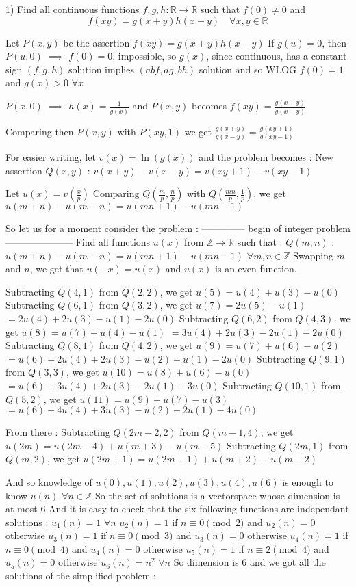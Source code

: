 \begin{solution}
	\begin{tcolorbox}1) Find all continuous functions $f,g,h:\mathbb{R}\to\mathbb{R}$ such that $f(0)\neq 0$ and 
\[f(xy)=g(x+y)h(x-y) \quad \forall x,y\in\mathbb{R}\]\end{tcolorbox}
Let $P(x,y)$ be the assertion $f(xy)=g(x+y)h(x-y)$
If $g(u)=0$, then $P(u,0)$ $\implies$ $f(0)=0$, impossible, so $g(x)$, since continuous, has a constant sign
$(f,g,h)$ solution implies $(abf,ag,bh)$ solution and so WLOG $f(0)=1$ and $g(x)>0$ $\forall x$

$P(x,0)$ $\implies$ $h(x)=\frac 1{g(x)}$ and $P(x,y)$ becomes $f(xy)=\frac{g(x+y)}{g(x-y)}$

Comparing then $P(x,y)$ with $P(xy,1)$ we get $\frac{g(x+y)}{g(x-y)}=\frac{g(xy+1)}{g(xy-1)}$

For easier writing, let $v(x)=\ln(g(x))$ and the problem becomes :
New assertion $Q(x,y)$ : $v(x+y)-v(x-y)=v(xy+1)-v(xy-1)$

Let $u(x)=v(\frac xp)$
Comparing $Q(\frac mp,\frac np)$ with $Q(\frac{mn}p,\frac 1p)$, we get $u(m+n)-u(m-n)=u(mn+1)-u(mn-1)$

So let us for a moment consider the problem :
-------------- begin of integer problem ---------------------
Find all functions $u(x)$ from $\mathbb Z\to \mathbb R$ such that :
$Q(m,n)$ : $u(m+n)-u(m-n)=u(mn+1)-u(mn-1)$ $\forall m,n\in\mathbb Z$
Swapping $m$ and $n$, we get that $u(-x)=u(x)$ and $u(x)$ is an even function.

Subtracting $Q(4,1)$ from $Q(2,2)$, we get $u(5)=u(4)+u(3)-u(0)$
Subtracting $Q(6,1)$ from $Q(3,2)$, we get $u(7)=2u(5)-u(1)$ $=2u(4)+2u(3)-u(1)-2u(0)$
Subtracting $Q(6,2)$ from $Q(4,3)$, we get $u(8)=u(7)+u(4)-u(1)$ $=3u(4)+2u(3)-2u(1)-2u(0)$
Subtracting $Q(8,1)$ from $Q(4,2)$, we get $u(9)=u(7)+u(6)-u(2)$ $=u(6)+2u(4)+2u(3)-u(2)-u(1)-2u(0)$
Subtracting $Q(9,1)$ from $Q(3,3)$, we get $u(10)=u(8)+u(6)-u(0)$ $=u(6)+3u(4)+2u(3)-2u(1)-3u(0)$
Subtracting $Q(10,1)$ from $Q(5,2)$, we get $u(11)=u(9)+u(7)-u(3)$ $=u(6)+4u(4)+3u(3)-u(2)-2u(1)-4u(0)$

From there :
Subtracting $Q(2m-2,2)$ from $Q(m-1,4)$, we get $u(2m)=u(2m-4)+u(m+3)-u(m-5)$
Subtracting $Q(2m,1)$ from $Q(m,2)$, we get $u(2m+1)=u(2m-1)+u(m+2)-u(m-2)$

And so knowledge of $u(0),u(1),u(2),u(3), u(4),u(6)$ is enough to know $u(n)$ $\forall n\in\mathbb Z$
So the set of solutions is a vectorspace whose dimension is at most $6$
And it is easy to check that the six following functions are independant solutions :
$u_1(n)=1$ $\forall n$
$u_2(n)=1$ if $n\equiv 0\pmod 2$ and $u_2(n)=0$ otherwise
$u_3(n)=1$ if $n\equiv 0\pmod 3$ and $u_3(n)=0$ otherwise
$u_4(n)=1$ if $n\equiv 0\pmod 4$ and $u_4(n)=0$ otherwise
$u_5(n)=1$ if $n\equiv 2\pmod 4$ and $u_5(n)=0$ otherwise
$u_6(n)=n^2$ $\forall n$
So dimension is $6$ and we got all the solutions of the simplified problem :


\end{solution}
